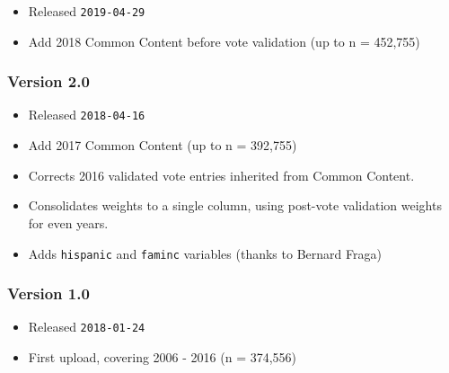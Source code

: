 \documentclass[10pt,article,oneside]{memoir}
\theoremstyle{definition}
\begin{document}
\begin{itemize}
\tightlist
\item
  Released \texttt{2019-04-29}
\item
  Add 2018 Common Content before vote validation (up to n = 452,755)
\end{itemize}

\hypertarget{version-2.0}{%
\subsubsection{Version 2.0}\label{version-2.0}}

\begin{itemize}
\tightlist
\item
  Released \texttt{2018-04-16}
\item
  Add 2017 Common Content (up to n = 392,755)
\item
  Corrects 2016 validated vote entries inherited from Common Content.
\item
  Consolidates weights to a single column, using post-vote validation
  weights for even years.
\item
  Adds \texttt{hispanic} and \texttt{faminc} variables (thanks to
  Bernard Fraga)
\end{itemize}

\hypertarget{version-1.0}{%
\subsubsection{Version 1.0}\label{version-1.0}}

\begin{itemize}
\tightlist
\item
  Released \texttt{2018-01-24}
\item
  First upload, covering 2006 - 2016 (n = 374,556)
\end{itemize}
\end{document}
